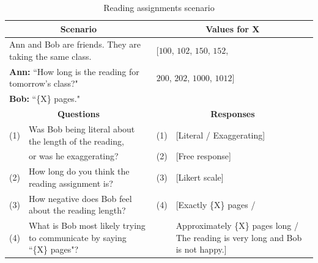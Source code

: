 \documentclass{article} %
\begin{document}
\begin{table}[h]
\begin{tabular}{| p{0.15cm}  p{8.15cm}| p{0.15cm}p{4cm} |}\hline
\multicolumn{2}{|c|}{\textbf{Scenario}} & \multicolumn{2}{c|}{\textbf{Values for X}} \\\hline
\multicolumn{2}{|l|}{Ann and Bob are friends. They are taking the same class.} & \multicolumn{2}{l|}{[$100$, $102$, $150$, $152$,}\\
\multicolumn{2}{|l|}{\textbf{Ann:} ``How long is the reading for tomorrow's class?"} & \multicolumn{2}{l|}{$200$, $202$, $1000$, $1012$]}\\
\multicolumn{2}{|l|}{\textbf{Bob:} ``\{X\} pages."} & \multicolumn{2}{l|}{}\\\hline
\multicolumn{2}{|c|}{\textbf{Questions}} & \multicolumn{2}{c|}{\textbf{Responses}} \\\hline
(1) & Was Bob being literal about the length of the reading, & (1) &[Literal / Exaggerating] \\
 & or was he exaggerating? & (2) & [Free response] \\
(2) & How long do you think the reading assignment is? & (3) & [Likert scale] \\
(3) & How negative does Bob feel about the reading length? & (4) & [Exactly \{X\} pages / \\
(4) & What is Bob most likely trying to communicate by saying  ``\{X\} pages"? & & Approximately \{X\} pages long / The reading is very long and Bob is not happy.]\\\hline
\end{tabular}
\caption{Reading assignments scenario}
\label{tab:readingtable}
\end{table}
\end{document}
